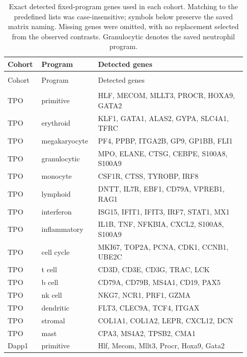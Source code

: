 \begingroup
\small
\setlength{\tabcolsep}{2.5pt}
\renewcommand{\arraystretch}{1.13}
\begin{longtable}{@{}>{\raggedright\arraybackslash}p{0.12\linewidth}>{\raggedright\arraybackslash}p{0.22\linewidth}>{\raggedright\arraybackslash}p{0.59\linewidth}@{}}
\caption{Exact detected fixed-program genes used in each cohort. Matching to the predefined lists was case-insensitive; symbols below preserve the saved matrix naming. Missing genes were omitted, with no replacement selected from the observed contrasts. Granulocytic denotes the saved neutrophil program.}\label{tab:s04_detected_program_genes}\\
\toprule
Cohort & Program & Detected genes \\
\midrule
\endfirsthead
\multicolumn{3}{l}{\small\tablename\ \thetable\ continued}\\
\toprule
Cohort & Program & Detected genes \\
\midrule
\endhead
\midrule
\multicolumn{3}{r}{\small Continued on next page}\\
\endfoot
\bottomrule
\endlastfoot
TPO & primitive & HLF, MECOM, MLLT3, PROCR, HOXA9, GATA2 \\
TPO & erythroid & KLF1, GATA1, ALAS2, GYPA, SLC4A1, TFRC \\
TPO & megakaryocyte & PF4, PPBP, ITGA2B, GP9, GP1BB, FLI1 \\
TPO & granulocytic & MPO, ELANE, CTSG, CEBPE, S100A8, S100A9 \\
TPO & monocyte & CSF1R, CTSS, TYROBP, IRF8 \\
TPO & lymphoid & DNTT, IL7R, EBF1, CD79A, VPREB1, RAG1 \\
TPO & interferon & ISG15, IFIT1, IFIT3, IRF7, STAT1, MX1 \\
TPO & inflammatory & IL1B, TNF, NFKBIA, CXCL2, S100A8, S100A9 \\
TPO & cell cycle & MKI67, TOP2A, PCNA, CDK1, CCNB1, UBE2C \\
TPO & t cell & CD3D, CD3E, CD3G, TRAC, LCK \\
TPO & b cell & CD79A, CD79B, MS4A1, CD19, PAX5 \\
TPO & nk cell & NKG7, NCR1, PRF1, GZMA \\
TPO & dendritic & FLT3, CLEC9A, TCF4, ITGAX \\
TPO & stromal & COL1A1, COL1A2, LEPR, CXCL12, DCN \\
TPO & mast & CPA3, MS4A2, TPSB2, CMA1 \\
Dapp1 & primitive & Hlf, Mecom, Mllt3, Procr, Hoxa9, Gata2 \\

\end{longtable}
